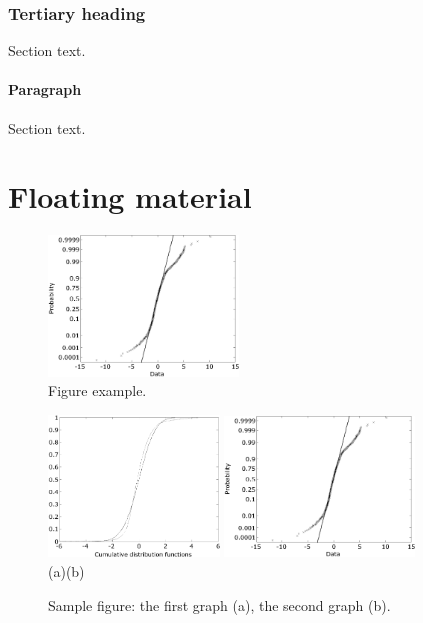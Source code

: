 \documentclass{amcs}
\begin{document}
\subsubsection{Tertiary heading} Section text.
\paragraph{Paragraph} Section text.

\section{Floating material}
%
\begin{figure}[!b]
 \centering
  \includegraphics[width=0.45\textwidth]{fig1}
  \caption{Figure example.}
  \label{fig1}
\end{figure}
%
\begin{figure}[!t]
 \centering
  \includegraphics[width=0.405\textwidth]{fig2a}\hspace{0.5cm}
  \includegraphics[width=0.45\textwidth]{fig2b}\\
  (a)\hspace{8cm}(b)
  \caption{Sample figure: the first graph (a), the second graph (b).}
  \label{fig2}
\end{figure}
%
\end{document}

